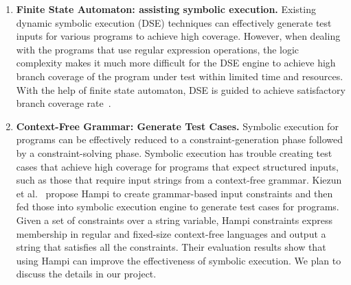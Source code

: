 \documentclass[times, 10pt,onecolumn]{article}
\begin{document}
\begin{enumerate}
\item{\textbf{Finite State Automaton: assisting symbolic execution.} Existing dynamic symbolic execution (DSE) techniques can effectively generate test inputs for various programs to achieve high coverage. However, when dealing with the programs that use regular expression operations, the logic complexity makes it much more difficult for the DSE engine to achieve high branch coverage of the program under test within limited time and resources. With the help of finite state automaton, DSE is guided to achieve satisfactory branch coverage rate~\cite{reggae}.}

\item{\textbf{Context-Free Grammar: Generate Test Cases.} Symbolic execution for programs can be effectively reduced to a constraint-generation phase followed by a constraint-solving phase. Symbolic execution has trouble creating test cases that achieve high coverage for programs that expect structured inputs, such as those that require input strings from a context-free grammar. Kiezun et al.~\cite{hampi} propose Hampi to create grammar-based input constraints and then fed those into symbolic execution engine to generate test cases for programs. Given a set of constraints over a string variable, Hampi constraints express membership in regular and fixed-size context-free languages and output a string that satisfies all the constraints. Their evaluation results show that using Hampi can improve the effectiveness of symbolic execution. We plan to discuss the details in our project.}


\end{enumerate}
\end{document}
